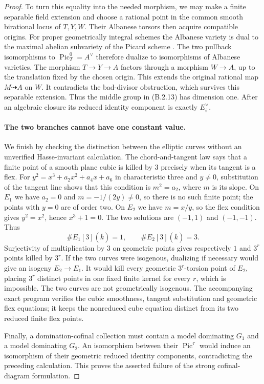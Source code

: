 \begin{proof}
To turn this equality into the needed morphism, we may make a
finite separable field extension and choose a rational point
in the common smooth birational locus of $T,Y,W$.  Their
Albanese torsors then acquire compatible origins.  For proper
geometrically integral schemes the Albanese variety is dual to
the maximal abelian subvariety of the Picard scheme
\cite[Theorem 3.2 and Remark 3.3, pp.~12--13 of the author
manuscript]{C_ACMV2026}.  The two pullback isomorphisms to
$\operatorname{Pic}^0_T=A^\vee$ therefore dualize to
isomorphisms of Albanese varieties.  The morphism
$T\to Y\to A$ factors through a morphism $W\to A$, up to
the translation fixed by the chosen origin.  This extends the
original rational map $M\dashrightarrow A$ on $W$.
It contradicts the bad-divisor obstruction, which survives
this separable extension.  Thus the middle group in (B.2.13)
has dimension one.  After an algebraic closure its reduced
identity component is exactly $E_i^\vee$.

\paragraph{The two branches cannot have one constant value.}
We finish by checking the distinction between the elliptic
curves without an unverified Hasse-invariant calculation.
The chord-and-tangent law
\cite[Chapter I, Section 3, Theorem 3.1, pp.~25--27]{MilneEC2021B}
says that a finite point of a smooth plane cubic is killed by
$3$ precisely when its tangent is a flex.  For
$y^2=x^3+a_2x^2+a_4x+a_6$ in characteristic three and $y\ne0$,
substitution of the tangent line shows that this condition is
$m^2=a_2$, where $m$ is its slope.  On $E_1$ we have
$a_2=0$ and $m=-1/(2y)\ne0$, so there is no such finite point;
the points with $y=0$ are of order two.  On $E_2$ we have
$m=x/y$, so the flex condition gives $y^2=x^2$, hence
$x^3+1=0$.  The two solutions are $(-1,1)$ and $(-1,-1)$.
Thus
\[
 \#E_1[3](\bar k)=1,\qquad \#E_2[3](\bar k)=3.
\]
Surjectivity of multiplication by $3$ on geometric points
gives respectively $1$ and $3^r$ points killed by $3^r$.
If the two curves were isogenous, dualizing if necessary would
give an isogeny $E_2\to E_1$.  It would kill every geometric
$3^r$-torsion point of $E_2$, placing $3^r$ distinct points in
one fixed finite kernel for every $r$, which is impossible.
The two curves are not geometrically isogenous.
The accompanying exact program verifies the cubic smoothness,
tangent substitution and geometric flex equations; it keeps
the nonreduced cube equation distinct from its two reduced
finite flex points.

Finally, a domination-cofinal collection must contain a model
dominating $G_1$ and a model dominating $G_2$.  An isomorphism
between their $\operatorname{Pic}^{\tau}$ would induce an
isomorphism of their geometric reduced identity components,
contradicting the preceding calculation.  This proves the
asserted failure of the strong cofinal-diagram formulation.
\end{proof}


